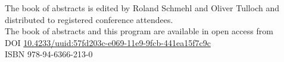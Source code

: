 The book of abstracts is edited by Roland Schmehl and Oliver Tulloch and distributed to registered conference attendees.\\[.1cm]

The book of abstracts and this program are available in open access from\\
DOI \href{https://doi.org/10.4233/uuid:57fd203c-e069-11e9-9fcb-441ea15f7c9c}{10.4233/uuid:57fd203c-e069-11e9-9fcb-441ea15f7c9c}\\
ISBN 978-94-6366-213-0\\
